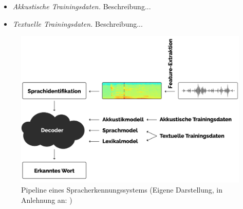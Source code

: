 \begin{itemize}
    \item \textit{Akkustische Trainingsdaten.} Beschreibung...
    \item \textit{Textuelle Trainingsdaten.} Beschreibung...
\end{itemize}

\begin{figure}[h!]
    \centering
    \includegraphics[width=1\linewidth]{images/pipeline}
    \caption{Pipeline eines Spracherkennungssystems (Eigene Darstellung, in Anlehnung an: \cite{Tom.2016}) }%
    \label{fig:pipeline}
\end{figure}